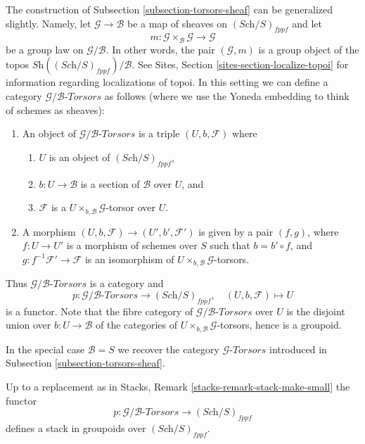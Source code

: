 \noindent
The construction of
Subsection \ref{subsection-torsors-sheaf}
can be generalized slightly.
Namely, let $\mathcal{G} \to \mathcal{B}$ be a map of sheaves
on $(\textit{Sch}/S)_{fppf}$ and let
$$
m :
\mathcal{G} \times_{\mathcal{B}} \mathcal{G} 
\longrightarrow
\mathcal{G}
$$
be a group law on $\mathcal{G}/\mathcal{B}$. In other words, the pair
$(\mathcal{G}, m)$ is a group object of the topos
$\textit{Sh}((\textit{Sch}/S)_{fppf})/\mathcal{B}$. See
Sites, Section \ref{sites-section-localize-topoi}
for information regarding localizations of topoi.
In this setting we can define a category
$\mathcal{G}/\mathcal{B}\textit{-Torsors}$ as follows
(where we use the Yoneda embedding to think of schemes as sheaves):
\begin{enumerate}
\item An object of $\mathcal{G}/\mathcal{B}\textit{-Torsors}$ is a triple
$(U, b, \mathcal{F})$ where
\begin{enumerate}
\item $U$ is an object of $(\textit{Sch}/S)_{fppf}$,
\item $b : U \to \mathcal{B}$ is a section of $\mathcal{B}$ over $U$, and
\item $\mathcal{F}$ is a $U \times_{b, \mathcal{B}}\mathcal{G}$-torsor
over $U$.
\end{enumerate}
\item A morphism $(U, b, \mathcal{F}) \to (U', b', \mathcal{F}')$ is given
by a pair $(f, g)$, where $f : U \to U'$ is a morphism of schemes
over $S$ such that $b = b' \circ f$, and
$g : f^{-1}\mathcal{F}' \to \mathcal{F}$ is an
isomorphism of $U \times_{b, \mathcal{B}} \mathcal{G}$-torsors.
\end{enumerate}
Thus $\mathcal{G}/\mathcal{B}\textit{-Torsors}$ is a category and
$$
p :
\mathcal{G}/\mathcal{B}\textit{-Torsors}
\longrightarrow
(\textit{Sch}/S)_{fppf},
\quad
(U, b, \mathcal{F}) \longmapsto U
$$
is a functor. Note that the fibre category of
$\mathcal{G}/\mathcal{B}\textit{-Torsors}$
over $U$ is the disjoint union over $b : U \to \mathcal{B}$
of the categories of $U \times_{b, \mathcal{B}} \mathcal{G}$-torsors,
hence is a groupoid.

\medskip\noindent
In the special case $\mathcal{B} = S$ we recover the category
$\mathcal{G}\textit{-Torsors}$ introduced in
Subsection \ref{subsection-torsors-sheaf}.

\begin{lemma}
\label{lemma-variant-torsors-sheaf-stack-in-groupoids}
Up to a replacement as in
Stacks, Remark \ref{stacks-remark-stack-make-small}
the functor
$$
p :
\mathcal{G}/\mathcal{B}\textit{-Torsors}
\longrightarrow
(\textit{Sch}/S)_{fppf}
$$
defines a stack in groupoids over $(\textit{Sch}/S)_{fppf}$.
\end{lemma}

